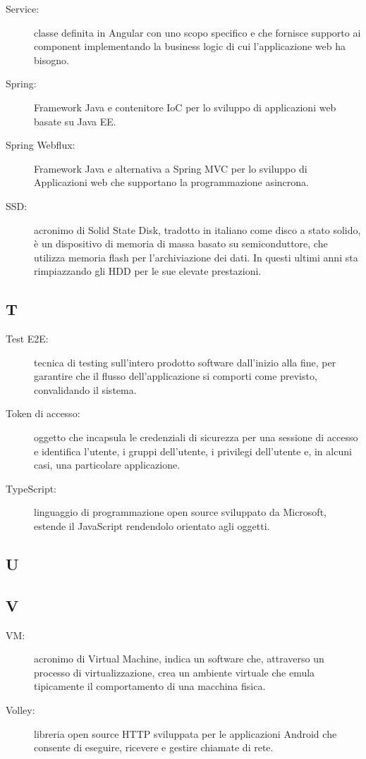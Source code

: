 \documentclass[../manuale-manutentore.tex]{subfiles}
\begin{document}
\begin{description}
    \item[Service:] classe definita in Angular con uno scopo specifico e che fornisce supporto ai component implementando la business logic di cui l'applicazione web ha bisogno.
    \item[Spring:] Framework Java e contenitore IoC per lo sviluppo di applicazioni web basate su Java EE\@.
    \item[Spring Webflux:] Framework Java e alternativa a Spring MVC per lo sviluppo di Applicazioni web che supportano la programmazione asincrona.
    \item[SSD:] acronimo di Solid State Disk, tradotto in italiano come disco a stato solido, è un dispositivo di memoria di massa basato su semiconduttore, che utilizza memoria flash per l'archiviazione dei dati. In questi ultimi anni sta rimpiazzando gli HDD per le sue elevate prestazioni.
\end{description}

\subsection{T}

\begin{description}
    \item[Test E2E:] tecnica di testing sull'intero prodotto software dall'inizio alla fine, per garantire che il flusso dell'applicazione si comporti come previsto, convalidando il sistema.
    \item[Token di accesso:] oggetto che incapsula le credenziali di sicurezza per una sessione di accesso e identifica l'utente, i gruppi dell'utente, i privilegi dell'utente e, in alcuni casi, una particolare applicazione.
    \item[TypeScript:] linguaggio di programmazione open source sviluppato da Microsoft, estende il JavaScript rendendolo orientato agli oggetti.
\end{description}

\subsection{U}

\subsection{V}

\begin{description}
    \item[VM:] acronimo di Virtual Machine, indica un software che, attraverso un processo di virtualizzazione, crea un ambiente virtuale che emula tipicamente il comportamento di una macchina fisica.
    \item[Volley:] libreria open source HTTP sviluppata per le applicazioni Android che consente di eseguire, ricevere e gestire chiamate di rete.
\end{description}
\end{document}
